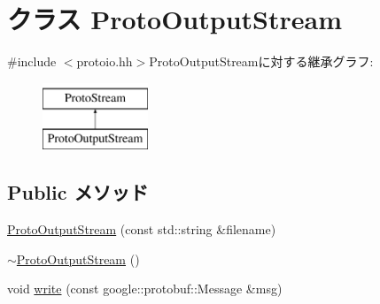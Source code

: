 \hypertarget{classProtoOutputStream}{
\section{クラス ProtoOutputStream}
\label{classProtoOutputStream}
}


{\ttfamily \#include $<$protoio.hh$>$}ProtoOutputStreamに対する継承グラフ:\begin{figure}[H]
\begin{center}
\leavevmode
\includegraphics[height=2cm]{classProtoOutputStream}
\end{center}
\end{figure}
\subsection*{Public メソッド}
\begin{DoxyCompactItemize}
\item 
\hyperlink{classProtoOutputStream_a346f0950b2f8e1b86d25628d4ec21420}{ProtoOutputStream} (const std::string \&filename)
\item 
\hyperlink{classProtoOutputStream_a158b44af3e3b5991f9d98c92700faa88}{$\sim$ProtoOutputStream} ()
\item 
void \hyperlink{classProtoOutputStream_ae87c10d7923fb2245ff05bb305ec27ae}{write} (const google::protobuf::Message \&msg)
\end{DoxyCompactItemize}
